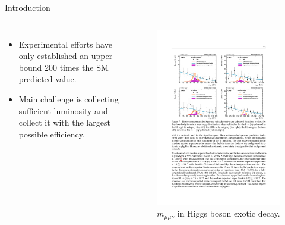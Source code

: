 \documentclass[aspectratio = 1610, xcolor = dvipsnames]{beamer}
\newcommand{\red}{\textcolor{unipd}}
\begin{document}
	
    \begin{frame}[t]{Introduction}

        \begin{columns}[c]


            \begin{itemize}
                \item Experimental efforts have only established an \red{upper bound} 200 times the SM predicted value.
                \item Main challenge is \red{collecting sufficient luminosity} and collect it with the \red{largest possible efficiency}.
            \end{itemize}
		

            \begin{figure}[c]
                \centering
                \includegraphics[width=1\textwidth]{images/results-H.pdf}
                \caption{$m_{\mu\mu\gamma}$ in Higgs boson exotic decay\footnotemark.
                \label{im:results-H}}
            \end{figure}

        \end{columns}


	\end{frame}
	
\end{document}
